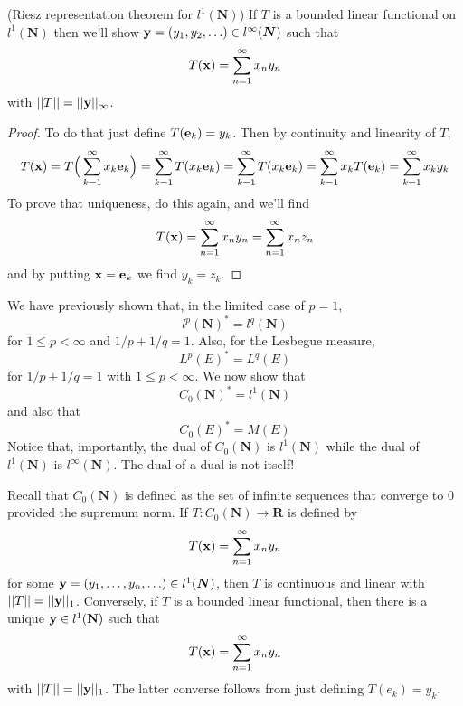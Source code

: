 \vspace{2ex}
\begin{thm}
(Riesz representation theorem for $l^{1}({\bm N})$) If $T$ is a bounded linear functional on $l^{1}({\bm N})$ then we'll show ${\bf y}=(y_1,y_2,\ldots )\in l^{\infty }({\bm N})$ such that
\[T({\bf x})=\sum ^{\infty }_{n=1}x_{n}y_{n}\]
with $||T||=||{\bf y}||_{\infty }$.
\end{thm}
\vspace{2ex}
\begin{proof}
To do that just define $T({\bf e}_{k})=y_{k}$. Then by continuity and linearity of $T$,
\[T({\bf x})=T\Big(\sum ^{\infty }_{k=1}x_{k}{\bf e}_{k}\Big)=\sum ^{\infty }_{k=1}T(x_{k}{\bf e}_{k})=\sum ^{\infty }_{k=1}T(x_{k}{\bf e}_{k})=\sum ^{\infty }_{k=1}x_{k}T({\bf e}_{k})=\sum ^{\infty }_{k=1}x_{k}y_{k}\]
To prove that uniqueness, do this again, and we'll find
\[T({\bf x})=\sum_{n=1}^{\infty } x_{n}y_{n}=\sum _{n=1}^{\infty }x_{n}z_{n}\]
and by putting ${\bf x}={\bf e}_{k}$ we find $y_{k}=z_{k}$.
\end{proof}
\vspace{2ex}
\begin{rmk}
We have previously shown that, in the limited case of $p=1$, 
\[l^{p}({\bm N})^{*}=l^{q}({\bm N})\] 
for $1\leq p<\infty $ and $1/p+1/q=1$. Also, for the Lesbegue measure,
\[L^{p}(E)^{*}=L^{q}(E)\]
for $1/p+1/q=1$ with $1\leq p<\infty $. We now show that
\[C_{0}({\bm N})^{*}=l^{1}({\bm N})\]
and also that
\[C_{0}(E)^{*}=M(E)\]
Notice that, importantly, the dual of $C_{0}({\bm N})$ is $l^{1}({\bm N})$ while the dual of $l^{1}({\bm N})$ is $l^{\infty }({\bm N})$. The dual of a dual is not itself!
\end{rmk} 
\vspace{2ex}
\begin{thm}
Recall that $C_{0}({\bm N})$ is defined as the set of infinite sequences that converge to $0$ provided the supremum norm. If $T:C_{0}({\bm N})\rightarrow {\bm R}$ is defined by
\[T({\bf x})=\sum ^{\infty }_{n=1}x_{n}y_{n}\]
for some ${\bf y}=(y_1,\ldots ,y_{n},\ldots )\in l^{1}({\bm N})$, then $T$ is continuous and linear with $||T||=||{\bf y}||_{1}$. Conversely, if $T$ is a bounded linear functional, then there is a unique ${\bf y}\in l^{1}({\bf N})$ such that 
\[T({\bf x})=\sum ^{\infty }_{n=1}x_{n}y_{n}\]
with $||T||=||{\bf y}||_{1}$. The latter converse follows from just defining $T(e_{k})=y_{k}$. 
\end{thm}
\vspace{2ex}
